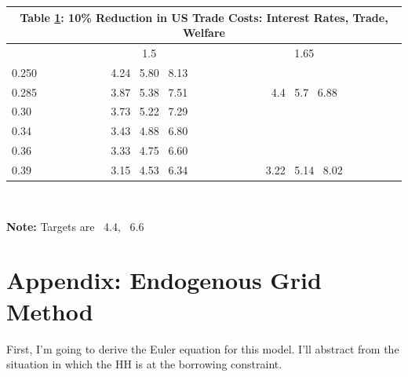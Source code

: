 \documentclass[12pt,pdftex]{article}
\renewcommand{\arraystretch}{1.1}
\begin{document}
\begin{onehalfspacing}
\begin{table}[t]
\small
\begin{center}
\setlength {\tabcolsep}{5.75mm}
\renewcommand{\arraystretch}{1.60}\label{tb-welfare}
\begin{tabular}[t]{l c c c}
\multicolumn{4}{c}{{\normalsize\textbf{Table \ref{tb-welfare}: 10\% Reduction in US Trade Costs: Interest Rates, Trade, Welfare}} }
\\ \hline \hline
& 1.5 & 1.65 &  \\
0.250 & 4.24 \ 5.80 \ 8.13   &  & \\
0.285 & 3.87 \ 5.38 \ 7.51  & 4.4 \ 5.7 \ 6.88 & \\
0.30 & 3.73 \ 5.22 \ 7.29  & & \\
0.34 & 3.43 \ 4.88 \ 6.80  & & \\
0.36 & 3.33 \ 4.75 \ 6.60  & & \\
0.39 & 3.15 \ 4.53 \ 6.34  & 3.22 \ 5.14 \ 8.02 & \\
\hline
\end{tabular}
\\[0.5ex]
\parbox{5.75in}{\footnotesize \textbf{Note:} Targets are \ 4.4, \ 6.6}
\end{center}
\end{table}

\newpage

\section{Appendix: Endogenous Grid Method}

First, I'm going to derive the Euler equation for this model. I'll abstract from the situation in which the HH is at the borrowing constraint.


\end{onehalfspacing}
\end{document}
